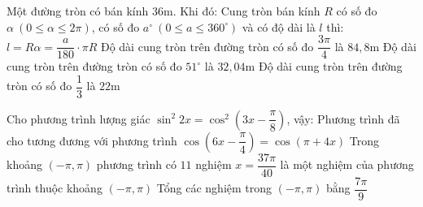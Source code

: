 \begin{ex} %
	Một đường tròn có bán kính $36\mathrm{m}$. Khi đó:
	\choiceTF
	{Cung tròn bán kính $R$ có số đo $\alpha\ (0 \le \alpha \le 2\pi)$, có số đo $a^\circ\ (0 \le a \le 360^\circ)$ và có độ dài là $l$ thì:
		$l = R\alpha = \dfrac{a}{180} \cdot \pi R$}
	{\True Độ dài cung tròn trên đường tròn có số đo $\dfrac{3\pi}{4}$ là $84,8\mathrm{m}$}
	{\True Độ dài cung tròn trên đường tròn có số đo $51^\circ$ là $32,04\mathrm{m}$}
	{Độ dài cung tròn trên đường tròn có số đo $\dfrac{1}{3}$ là $22\mathrm{m}$}
\end{ex}

\begin{ex} %
	Cho phương trình lượng giác $\sin^2 2x = \cos^2 \left( 3x - \dfrac{\pi}{8} \right)$, vậy:
	\choiceTF
	{\True Phương trình đã cho tương đương với phương trình $\cos \left( 6x - \dfrac{\pi}{4} \right) = \cos (\pi + 4x)$}
	{\True Trong khoảng $(-\pi, \pi)$ phương trình có $11$ nghiệm}
	{\True $x = \dfrac{37\pi}{40}$ là một nghiệm của phương trình thuộc khoảng $(-\pi, \pi)$}
	{Tổng các nghiệm trong $(-\pi, \pi)$ bằng $\dfrac{7\pi}{9}$}
\end{ex}

